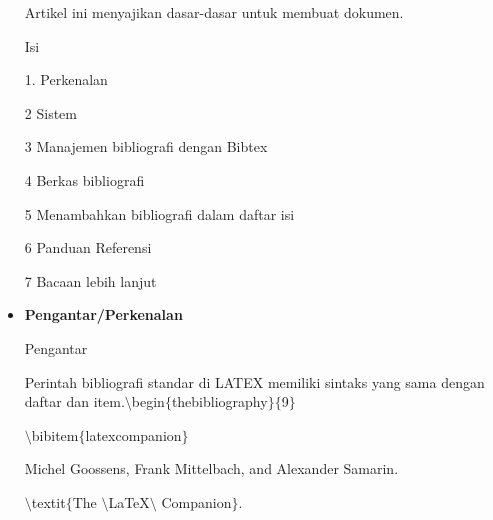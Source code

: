\begin{itemize}
\noindent Artikel ini menyajikan dasar-dasar untuk membuat dokumen.\par


\noindent \hspace*{0.5in}Isi\par


\noindent \hspace*{0.5in}1. Perkenalan\par


\noindent \hspace*{0.5in}2 Sistem\par


\noindent \hspace*{0.5in}3 Manajemen bibliografi dengan Bibtex\par


\noindent \hspace*{0.5in}4 Berkas bibliografi\par


\noindent \hspace*{0.5in}5 Menambahkan bibliografi dalam daftar isi\par


\noindent \hspace*{0.5in}6 Panduan Referensi\par


\noindent \hspace*{0.5in}7 Bacaan lebih lanjut\par

\vspace{12pt}
	\item {\fontsize{14pt}{14pt}\selectfont \textbf{Pengantar/Perkenalan}}\par

Pengantar\par

Perintah bibliografi standar di LATEX memiliki sintaks yang sama dengan daftar dan item.\hspace*{0.5in}$\setminus$begin$ \{ $thebibliography$ \} $$ \{ $9$ \} $\par

\hspace*{0.5in}$\setminus$bibitem$ \{ $latexcompanion$ \} $ \par

\hspace*{0.5in}Michel Goossens, Frank Mittelbach, and Alexander Samarin. \par

\hspace*{0.5in}$\setminus$textit$ \{ $The $\setminus$LaTeX$\setminus$ Companion$ \} $. \par


\end{itemize}
